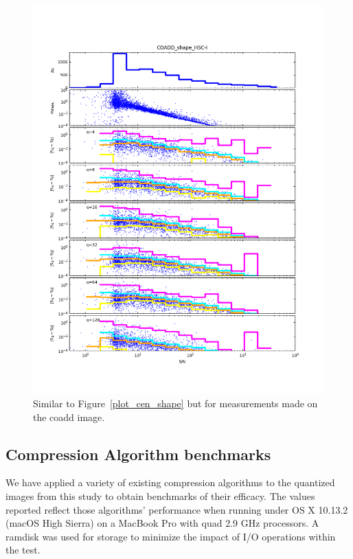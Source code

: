 \begin{figure}[t]
\begin{minipage}{.49\textwidth}
        \includegraphics[width=1.0\textwidth]{figure/plot_coadd_shape_HSC-I.png}
    \end{minipage}
\caption{Similar to Figure~\ref{plot_cen_shape} but for measurements made on the coadd image.}
\label{plot_coadd_cen_shape}
\end{figure}





\subsection{Compression Algorithm benchmarks}

We have applied a variety of existing compression algorithms to the quantized images from this study to 
obtain benchmarks of their efficacy.  The values reported reflect those algorithms' performance when
running under OS X 10.13.2 (macOS High Sierra) on a MacBook Pro with quad 2.9 GHz processors.  A ramdisk
was used for storage to minimize the impact of I/O operations within the test.  

